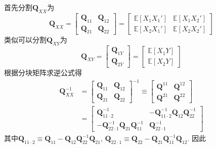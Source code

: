 \documentclass[cn, 12pt, math=mtpro2, bibstyle=apa, blue, twocol]{elegantbook}
\newcommand{\E}{\mathbb{E}}
\newcommand{\Q}{\mathbold{Q}}
\begin{document}
首先分割$\Q_{XX}$为
$$\Q_{XX}=\begin{bmatrix}
            \Q_{11} & \Q_{12} \\
            \Q_{21} & \Q_{22}
          \end{bmatrix}=\begin{bmatrix}
                          \E[X_1X_1'] & \E[X_1X_2'] \\
                          \E[X_2X_1'] & \E[X_2X_2']
                        \end{bmatrix}$$
类似可以分割$\Q_{XY}$为
$$\Q_{XY}=\begin{bmatrix}
            \Q_{1Y} \\
            \Q_{2Y}
          \end{bmatrix}=\begin{bmatrix}
                          \E[X_1Y] \\
                          \E[X_2Y]
                        \end{bmatrix}$$
根据分块矩阵求逆公式得
\begin{align}
  \Q_{XX}^{-1}&=\begin{bmatrix}
                 \Q_{11} & \Q_{12} \\
                 \Q_{21} & \Q_{22}
               \end{bmatrix}^{-1}\equiv\begin{bmatrix}
                                         \Q^{11} & \Q^{12} \\
                                         \Q^{21} & \Q^{22}
                                       \end{bmatrix} \nonumber \\
                                       &=\begin{bmatrix}
                                                       \Q_{11\cdot 2}^{-1} & -\Q_{11\cdot2}^{-1}\Q_{12}\Q_{22}^{-1} \\
                                                       -\Q_{22\cdot1}^{-1}\Q_{21}\Q_{11}^{-1} & \Q_{22\cdot1}^{-1}
                                                     \end{bmatrix} \label{eq1.19}
\end{align}
其中$\Q_{11\cdot2}\equiv\Q_{11}-\Q_{12}\Q_{22}^{-1}\Q_{21}$, $\Q_{22\cdot1}\equiv\Q_{22}-\Q_{21}\Q_{11}^{-1}\Q_{12}$. 因此
\end{document}
